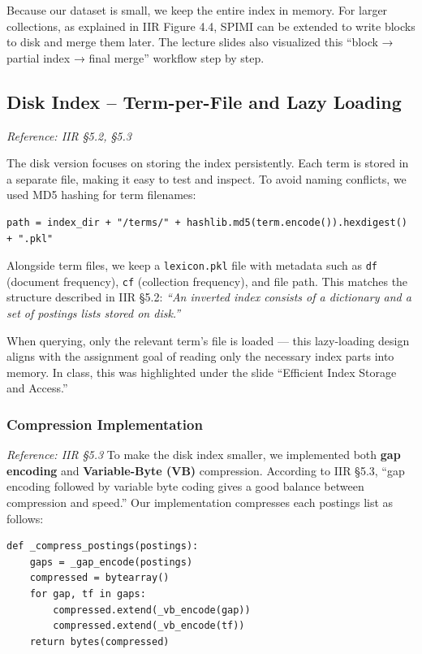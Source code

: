 \documentclass[11pt,a4paper]{article}
\begin{document}
Because our dataset is small, we keep the entire index in memory.
For larger collections, as explained in IIR Figure 4.4, SPIMI can be extended to write blocks to disk and merge them later.  
The lecture slides also visualized this “block → partial index → final merge” workflow step by step.

\subsection{Disk Index – Term-per-File and Lazy Loading}
\label{subsec:disk}
\textit{Reference: IIR §5.2, §5.3}

The disk version focuses on storing the index persistently.
Each term is stored in a separate file, making it easy to test and inspect.
To avoid naming conflicts, we used MD5 hashing for term filenames:
\begin{verbatim}
path = index_dir + "/terms/" + hashlib.md5(term.encode()).hexdigest() + ".pkl"
\end{verbatim}

Alongside term files, we keep a \texttt{lexicon.pkl} file with metadata such as 
\texttt{df} (document frequency), \texttt{cf} (collection frequency), and file path.
This matches the structure described in IIR §5.2:  
\textit{“An inverted index consists of a dictionary and a set of postings lists stored on disk.”}

When querying, only the relevant term’s file is loaded —  
this lazy-loading design aligns with the assignment goal of reading only the necessary index parts into memory.
In class, this was highlighted under the slide “Efficient Index Storage and Access.”

\subsubsection{Compression Implementation}
\label{subsubsec:compression}
\textit{Reference: IIR §5.3}
To make the disk index smaller, we implemented both \textbf{gap encoding} and \textbf{Variable-Byte (VB)} compression.
According to IIR §5.3, “gap encoding followed by variable byte coding gives a good balance between compression and speed.”
Our implementation compresses each postings list as follows:
\begin{verbatim}
def _compress_postings(postings):
    gaps = _gap_encode(postings)
    compressed = bytearray()
    for gap, tf in gaps:
        compressed.extend(_vb_encode(gap))
        compressed.extend(_vb_encode(tf))
    return bytes(compressed)
\end{verbatim}
\end{document}

